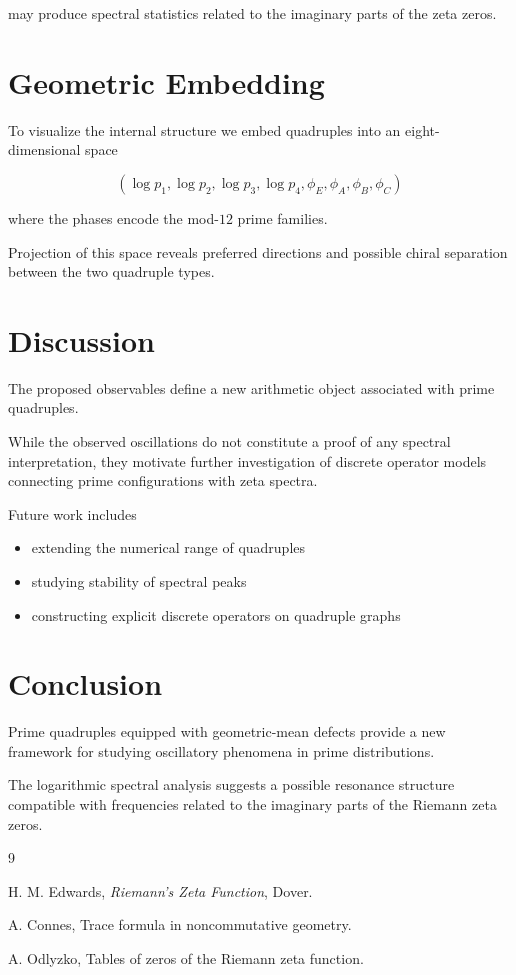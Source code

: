 \documentclass[11pt]{article}
\begin{document}
	may produce spectral statistics related to the imaginary parts of the zeta zeros.
	
	\section{Geometric Embedding}
	
	To visualize the internal structure we embed quadruples into an eight-dimensional space
	
	\[
	(\log p_1,\log p_2,\log p_3,\log p_4,\phi_E,\phi_A,\phi_B,\phi_C)
	\]
	
	where the phases encode the mod-$12$ prime families.
	
	Projection of this space reveals preferred directions and possible chiral separation between the two quadruple types.
	
	\section{Discussion}
	
	The proposed observables define a new arithmetic object associated with prime quadruples.
	
	While the observed oscillations do not constitute a proof of any spectral interpretation, they motivate further investigation of discrete operator models connecting prime configurations with zeta spectra.
	
	Future work includes
	
	\begin{itemize}
		\item extending the numerical range of quadruples
		\item studying stability of spectral peaks
		\item constructing explicit discrete operators on quadruple graphs
	\end{itemize}
	
	\section{Conclusion}
	
	Prime quadruples equipped with geometric-mean defects provide a new framework for studying oscillatory phenomena in prime distributions.
	
	The logarithmic spectral analysis suggests a possible resonance structure compatible with frequencies related to the imaginary parts of the Riemann zeta zeros.
	
	\begin{thebibliography}{9}
		
		H. M. Edwards,
		\textit{Riemann's Zeta Function},
		Dover.
		
		A. Connes,
		Trace formula in noncommutative geometry.
		
		A. Odlyzko,
		Tables of zeros of the Riemann zeta function.
		
	\end{thebibliography}
	
\end{document}
